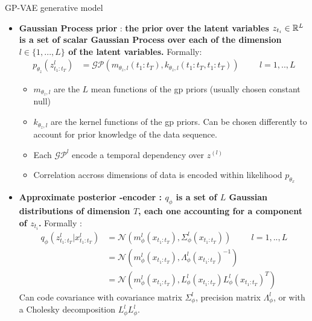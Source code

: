 \begin{frame}{GP-VAE generative model}
    \begin{itemize}
        \item \textbf{Gaussian Process prior} : \textbf{the prior over the latent variables $z_{t_i} \in \mathbb{R}^L$ is a set of scalar Gaussian Process over each of the dimension $l \in \{1,...,L\}$ of the latent variables.} Formally:
            \begin{align}
                p_{\theta_z}(z_{t_1:t_T}^l) &= \mathcal{GP}(m_{\theta_z, l}(t_1:t_T), k_{\theta_z, l}(t_1:t_T, t_1:t_T)) \hspace{1cm} l=1,..,L
            \end{align}
            \begin{itemize}
                \item $m_{\theta_z, l}$ are the $L$ mean functions of the \gls{gp} priors (usually chosen constant null)
                \item $k_{\theta_z, l}$ are the kernel functions of the \gls{gp} priors. Can be chosen differently to account for prior knowledge of the data sequence.
                \item Each $\mathcal{GP}^l$ encode a temporal dependency over $z^{(l)}$
                \item Correlation accross dimensions of data is encoded within likelihood $p_{\theta_x}$
            \end{itemize}
        \item \textbf{Approximate posterior -encoder : $q_\phi$ is a set of $L$ Gaussian distributions of dimension $T$, each one accounting for a component of $z_{t_i}$.} Formally :
            \begin{align}
                q_\phi(z_{t_1:t_T}^l \vert x_{t_1:t_T}^l) &= \mathcal{N}(m_{\phi}^l(x_{t_1:t_T}), \Sigma_{\phi}^l(x_{t_1:t_T})) \hspace{1cm} l=1,..,L \\
                &= \mathcal{N}(m_{\phi}^l(x_{t_1:t_T}), \Lambda_{\phi}^l(x_{t_1:t_T})^{-1}) \\
                &= \mathcal{N}(m_{\phi}^l(x_{t_1:t_T}), L_{\phi}^l(x_{t_1:t_T})L_{\phi}^l(x_{t_1:t_T})^T)
            \end{align}
            Can code covariance with covariance matrix $\Sigma_\phi^l$, precision matrix $\Lambda_\phi^l$, or with a Cholesky decomposition $L_{\phi}^lL_{\phi}^l$.
    \end{itemize}
\end{frame}


